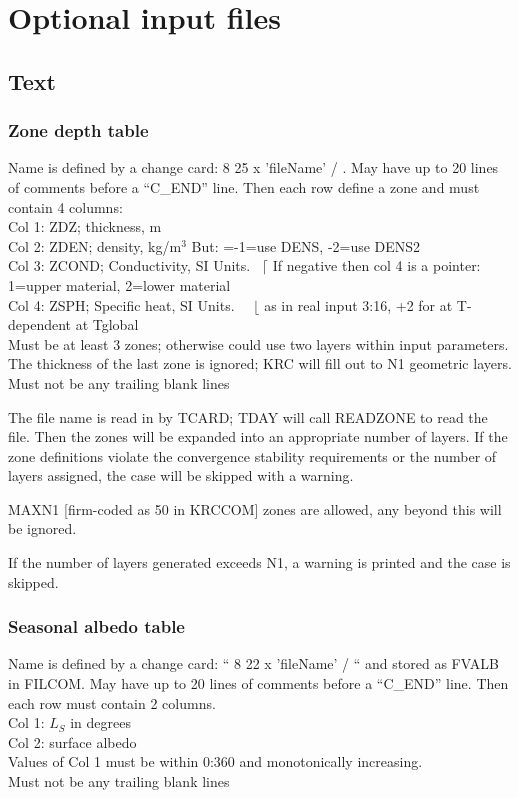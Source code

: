 \documentclass{article}
\newcommand{\qi}{\\ \hspace*{2.em}}      %
\begin{document}
\section{Optional input files} %
\subsection{Text}
\subsubsection{Zone depth table}
Name is defined by a change card: 8 25 x 'fileName' / . May have up to 20 lines
of comments before a ``C_END'' line. Then each row define a zone and must
contain 4 columns:
\qi Col 1: ZDZ; thickness, m
\qi Col 2: ZDEN; density, kg/m$^3$ \hspace{2.0 cm} But: =-1=use DENS, -2=use DENS2
\qi Col 3: ZCOND; Conductivity, SI Units. \ $\lceil$   If negative then col 4 is a pointer: 1=upper material, 2=lower material
\qi Col 4: ZSPH; Specific heat, SI Units. \ \  $\lfloor$ as in real input 3:16,  +2 for at T-dependent at Tglobal
\\ Must be at least 3 zones; otherwise could use two layers within input parameters. 
\\ The thickness of the last zone is ignored; KRC will fill out to N1 geometric layers.
\\ Must not be any trailing blank lines

The file name is read in by TCARD; TDAY will call READZONE to read the
file. Then the zones will be expanded into an appropriate number of layers. If
the zone definitions violate the convergence stability requirements or the
number of layers assigned, the case will be skipped with a warning.

MAXN1 [firm-coded as 50 in KRCCOM] zones are allowed, any beyond this will be
ignored.

If the number of layers generated exceeds N1, a warning is printed and the case
is skipped.

\subsubsection{Seasonal albedo table}
Name is defined by a change card: `` 8 22 x 'fileName' / `` and stored as FVALB
in FILCOM. May have up to 20 lines of comments before a ``C_END'' line. Then
each row must contain 2 columns.
\qi Col 1: $L_S$ in degrees
\qi Col 2: surface albedo
\\ Values of Col 1 must be within 0:360 and monotonically increasing. 
\qi Must not be any trailing blank lines
\end{document}
